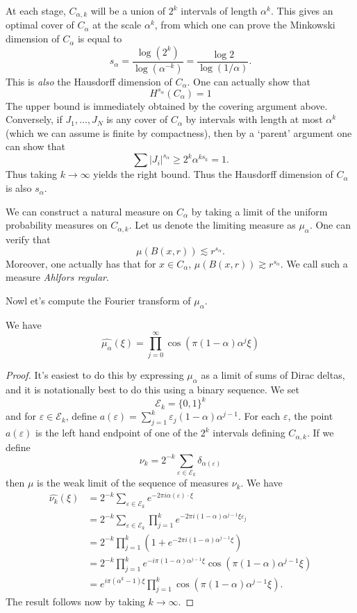 At each stage, $C_{\alpha,k}$ will be a union of $2^k$ intervals of length $\alpha^k$. This gives an optimal cover of $C_\alpha$ at the scale $\alpha^k$, from which one can prove the Minkowski dimension of $C_\alpha$ is equal to
%
\[ s_\alpha = \frac{\log(2^k)}{\log(\alpha^{-k})} = \frac{\log 2}{\log(1/\alpha)}. \]
%
This is \emph{also} the Hausdorff dimension of $C_\alpha$. One can actually show that
%
\[ H^{s_\alpha}(C_\alpha) = 1 \]
%
The upper bound is immediately obtained by the covering argument above. Conversely, if $J_1,\dots,J_N$ is any cover of $C_\alpha$ by intervals with length at most $\alpha^k$ (which we can assume is finite by compactness), then by a `parent' argument one can show that
%
\[ \sum |J_i|^{s_\alpha} \geq 2^k \alpha^{k s_k} = 1. \]
%
Thus taking $k \to \infty$ yields the right bound. Thus the Hausdorff dimension of $C_\alpha$ is also $s_\alpha$.

We can construct a natural measure on $C_\alpha$ by taking a limit of the uniform probability measures on $C_{\alpha,k}$. Let us denote the limiting measure as $\mu_\alpha$. One can verify that
%
\[ \mu(B(x,r)) \lesssim r^{s_\alpha}. \]
%
Moreover, one actually has that for $x \in C_\alpha$, $\mu(B(x,r)) \gtrsim r^{s_\alpha}$. We call such a measure \emph{Ahlfors regular}.

Nowl et's compute the Fourier transform of $\mu_\alpha$.

\begin{theorem}
  We have
  \[ \widehat{\mu_\alpha}(\xi) = \prod_{j = 0}^\infty \cos(\pi(1 - \alpha) \alpha^j \xi) \]
\end{theorem}
\begin{proof}
  It's easiest to do this by expressing $\mu_\alpha$ as a limit of sums of Dirac deltas, and it is notationally best to do this using a binary sequence. We set
  \[ \mathcal{E}_k = \{ 0, 1 \}^k \]
  and for $\varepsilon \in \mathcal{E}_k$, define $a(\varepsilon) = \sum_{j = 1}^k \varepsilon_j (1 - \alpha) \alpha^{j-1}$. For each $\varepsilon$, the point $a(\varepsilon)$ is the left hand endpoint of one of the $2^k$ intervals defining $C_{\alpha,k}$. If we define
  \[ \nu_k = 2^{-k} \sum_{\varepsilon \in \mathcal{E}_k} \delta_{\alpha(\varepsilon)} \]
  then $\mu$ is the weak limit of the sequence of measures $\nu_k$. We have
  \begin{align*}
    \widehat{\nu_k}(\xi) &= 2^{-k} \sum_{\varepsilon \in \mathcal{E}_k} e^{-2 \pi i \alpha(\varepsilon) \cdot \xi}\\
    &= 2^{-k} \sum_{\varepsilon \in \mathcal{E}_k} \prod_{j = 1}^k e^{-2 \pi i (1 - \alpha) \alpha^{j-1} \xi \varepsilon_j}\\
    &= 2^{-k} \prod_{j = 1}^k (1 + e^{-2 \pi i (1 - \alpha) \alpha^{j-1} \xi})\\
    &= 2^{-k} \prod_{j = 1}^k e^{- i \pi (1 - \alpha) \alpha^{j-1} \xi} \cos( \pi (1 - \alpha) \alpha^{j-1} \xi )\\
    &= e^{i \pi (\alpha^k - 1) \xi} \prod_{j = 1}^k \cos(\pi(1 - \alpha) \alpha^{j-1} \xi).
  \end{align*}
  The result follows now by taking $k \to \infty$.
\end{proof}

